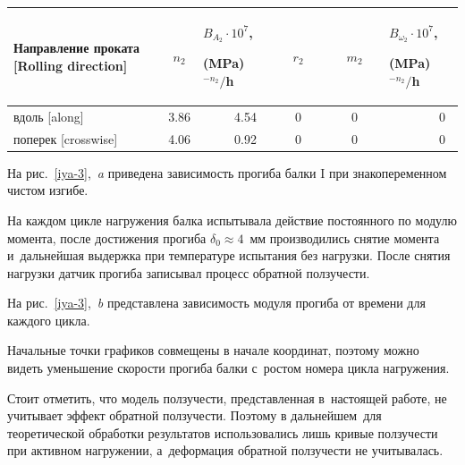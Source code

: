 \begin{table}[t!]
\begin{tabular}{p{3.4cm}|c|p{1.8cm}|c|c|p{1.8cm}}
{\footnotesize Направление проката [Rolling direction] } & \rule{0mm}{12pt}  {\footnotesize $n_2$} & {\footnotesize $B_{A_{2}} \cdot 10^{7}$, \par (MPa)$^{-n_2}/$h}& \footnotesize $r_2$& \footnotesize $m_2$ & {\footnotesize $B_{\omega_{2}} \cdot 10^{7}$, \par (MPa)$^{-n_2}/$h}\\

            \hline

            \rule{0mm}{12pt}%

           вдоль [along]      &  3.86&   ~~~~~4.54&~~~0~~~&~~~0~~~&~~~~~~~~0 \\

           поперек [crosswise]&  4.06& ~~~~~0.92  &~~~0~~~&~~~0~~~&~~~~~~~~0 \\

        

        

            \hline

        \end{tabular}



\end{table}







На рис.~\ref{iya-3},~{\sl a} приведена зависимость прогиба балки I при знакопеременном чистом изгибе. 

На каждом цикле нагружения балка испытывала действие постоянного по модулю момента, после достижения прогиба $\delta_0 \approx 4$~мм производились снятие момента и~дальнейшая выдержка при температуре испытания без нагрузки. После снятия нагрузки датчик прогиба записывал процесс обратной ползучести. 

На рис.~\ref{iya-3},~{\sl b} представлена зависимость модуля прогиба от времени для каждого цикла. 

Начальные точки графиков совмещены в начале координат, поэтому можно видеть уменьшение скорости прогиба балки с~ростом номера цикла нагружения. 

Стоит отметить, что модель ползучести, представленная в~настоящей работе, не учитывает эффект обратной ползучести. Поэтому в дальнейшем~для теоретической обработки результатов использовались лишь кривые ползучести при активном нагружении, а~деформация обратной ползучести не учитывалась.





